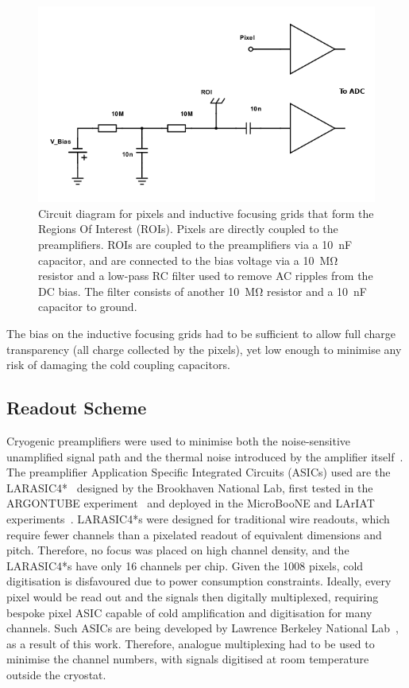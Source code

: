 \documentclass[instruments,article,submit,moreauthors,pdftex]{Definitions/mdpi}
\begin{document}
\begin{figure}[htb]
	\centering
	\includegraphics[width=0.65\linewidth]{Figures/schemeit-project_mod}
	\caption{Circuit diagram for pixels and inductive focusing grids that form the Regions Of Interest (ROIs). Pixels are directly coupled to the preamplifiers. ROIs are coupled to the preamplifiers via a \SI{10}{\nano\farad} capacitor, and are connected to the bias voltage via a \SI{10}{\mega\ohm} resistor and a low-pass RC filter used to remove AC ripples from the DC bias. The filter consists of another \SI{10}{\mega\ohm} resistor and a \SI{10}{\nano\farad} capacitor to ground.}
	\label{fig:circuit}
\end{figure}

The bias on the inductive focusing grids had to be sufficient to allow full charge transparency (all charge collected by the pixels), yet low enough to minimise any risk of damaging the cold coupling capacitors.

\subsection{Readout Scheme}

Cryogenic preamplifiers were used to minimise both the noise-sensitive unamplified signal path and the thermal noise introduced by the amplifier itself~\cite{art_cold_ero}.
The preamplifier Application Specific Integrated Circuits (ASICs) used are the LARASIC4*~\cite{larasic} designed by the Brookhaven National Lab, first tested in the ARGONTUBE experiment~\cite{art_cold_ero} and deployed in the MicroBooNE and LArIAT experiments~\cite{uboner,lariat}.
LARASIC4*s were designed for traditional wire readouts, which require fewer channels than a pixelated readout of equivalent dimensions and pitch. 
Therefore, no focus was placed on high channel density, and the LARASIC4*s have only 16 channels per chip.
Given the 1008 pixels, cold digitisation is disfavoured due to power consumption constraints. 
Ideally, every pixel would be read out and the signals then digitally multiplexed, requiring bespoke pixel ASIC capable of cold amplification and digitisation for many channels.
Such ASICs are being developed by Lawrence Berkeley National Lab~\cite{larpix}, as a result of this work. 
Therefore, analogue multiplexing had to be used to minimise the channel numbers, with signals digitised at room temperature outside the cryostat.
\end{document}
